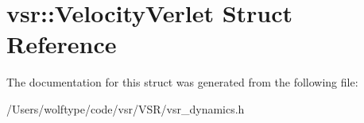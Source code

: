 \hypertarget{structvsr_1_1_velocity_verlet}{\section{vsr\-:\-:Velocity\-Verlet Struct Reference}
\label{structvsr_1_1_velocity_verlet}
}


The documentation for this struct was generated from the following file\-:\begin{DoxyCompactItemize}
\item 
/\-Users/wolftype/code/vsr/\-V\-S\-R/vsr\-\_\-dynamics.\-h\end{DoxyCompactItemize}
